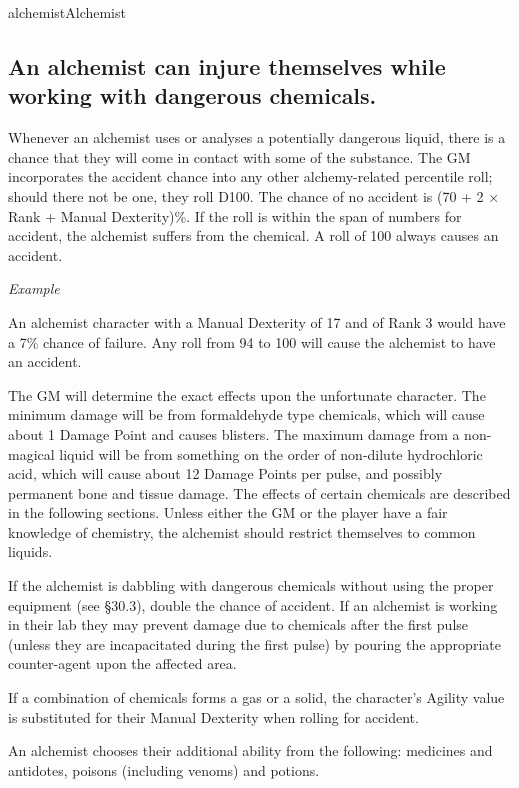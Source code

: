 \begin{Skill}[1.1]{alchemist}{Alchemist}
\subsection{An alchemist can injure themselves while working with dangerous chemicals.}

Whenever an alchemist uses or analyses a potentially dangerous liquid,
there is a chance that they will come in contact with some of the
substance.  The GM incorporates the accident chance into any other
alchemy-related percentile roll; should there not be one, they roll
D100.  The chance of no accident is (70 + 2 × Rank + Manual
Dexterity)\%.  If the roll is within the span of numbers for accident,
the alchemist suffers from the chemical.  A roll of 100 always causes
an accident.

\emph{Example}

An alchemist character with a Manual Dexterity of 17 and of
Rank 3 would have a 7\% chance of failure. Any roll from 94 to 100
will cause the alchemist to have an accident.

The GM will determine the exact effects upon the unfortunate
character.  The minimum damage will be from formaldehyde type
chemicals, which will cause about 1 Damage Point and causes blisters.
The maximum damage from a non-magical liquid will be from something on
the order of non-dilute hydrochloric acid, which will cause about 12
Damage Points per pulse, and possibly permanent bone and tissue
damage.  The effects of certain chemicals are described in the
following sections. Unless either the GM or the player have a fair
knowledge of chemistry, the alchemist should restrict themselves to
common liquids.

If the alchemist is dabbling with dangerous chemicals without using
the proper equipment (see §30.3), double the chance of accident. If an
alchemist is working in their lab they may prevent damage due to
chemicals after the first pulse (unless they are incapacitated during
the first pulse) by pouring the appropriate counter-agent upon the
affected area.

If a combination of chemicals forms a gas or a solid, the character’s
Agility value is substituted for their Manual Dexterity when rolling
for accident.


An alchemist chooses their additional ability from the following:
medicines and antidotes, poisons (including venoms) and potions.


\end{Skill}

